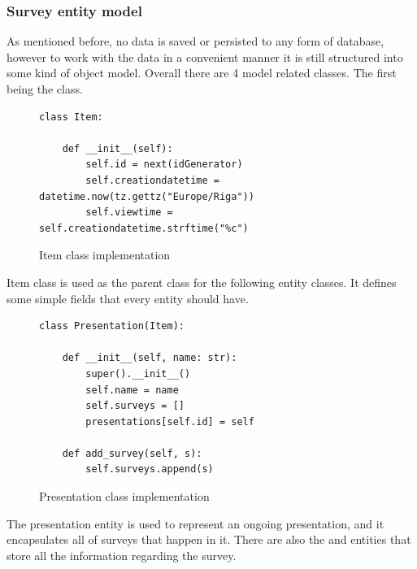\documentclass[12pt, fleqn, a4paper]{article}
\begin{document}
\subsubsection{Survey entity model}
As mentioned before, no data is saved or persisted to any form of database, however to work with the data in a convenient manner it is still structured into some kind of object model. Overall there are 4 model related classes. The first being the  class.
\begin{figure}[H]
	\centering
	\begin{verbatim} 
class Item:

    def __init__(self):
        self.id = next(idGenerator)
        self.creationdatetime = datetime.now(tz.gettz("Europe/Riga"))
        self.viewtime = self.creationdatetime.strftime("%c")
	\end{verbatim}
	\caption{Item class implementation}
\end{figure}
Item class is used as the parent class for the following entity classes. It defines some simple fields that every entity should have.
\begin{figure}[H]
	\centering
	\begin{verbatim} 
class Presentation(Item):

    def __init__(self, name: str):
        super().__init__()
        self.name = name
        self.surveys = []
        presentations[self.id] = self

    def add_survey(self, s):
        self.surveys.append(s)
	\end{verbatim}
	\caption{Presentation class implementation}
\end{figure}
The presentation entity is used to represent an ongoing presentation, and it encapsulates all of surveys that happen in it. There are also the  and  entities that store all the information regarding the survey.
\end{document}
